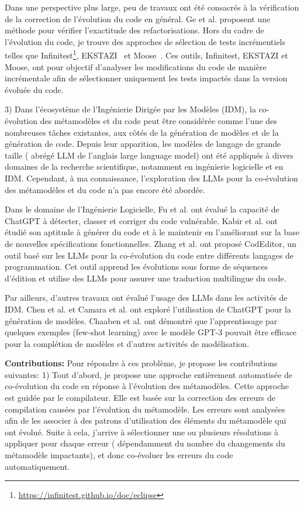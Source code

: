 Dans une perspective plus large, peu de travaux ont été consacrés à la vérification de la correction de l’évolution du code en général.
Ge et al. \cite{10.1145/2568225.2568280} proposent une méthode pour vérifier l'exactitude des refactorisations. Hors du cadre de l’évolution du code, je trouve des approches de sélection de tests incrémentiels telles que Infinitest\footnote{\url{https://infinitest.github.io/doc/eclipse}}, EKSTAZI~\cite{7203050} et Moose~\cite{ducasse2000moose}. Ces outils, Infinitest, EKSTAZI et Moose, ont pour objectif d'analyser les modifications du code de manière incrémentale afin de sélectionner uniquement les tests impactés dans la version évoluée du code.

3) Dans l’écosystème de l’Ingénierie Dirigée par les Modèles (IDM), la co-évolution des métamodèles et du code peut être considérée comme l’une des nombreuses tâches existantes, aux côtés de la génération de modèles et de la génération de code. Depuis leur apparition, les modèles de langage de grande taille ( abrégé LLM de l'anglais large language model) ont été appliqués à divers domaines de la recherche scientifique, notamment en ingénierie logicielle et en IDM. Cependant, à ma connaissance, l’exploration des LLMs pour la co-évolution des métamodèles et du code n’a pas encore été abordée.

Dans le domaine de l’Ingénierie Logicielle, Fu et al. \cite{fu2023chatgpt} ont évalué la capacité de ChatGPT à détecter, classer et corriger du code vulnérable. Kabir et al. \cite{kabir2023empirical} ont étudié son aptitude à générer du code et à le maintenir en l’améliorant sur la base de nouvelles spécifications fonctionnelles. Zhang et al. \cite{zhang2023multilingual} ont proposé CodEditor, un outil basé sur les LLMs pour la co-évolution du code entre différents langages de programmation. Cet outil apprend les évolutions sous forme de séquences d’édition et utilise des LLMs pour assurer une traduction multilingue du code.

Par ailleurs, d’autres travaux ont évalué l’usage des LLMs dans les activités de IDM. Chen et al. \cite{10344012} et Camara et al. \cite{camara2023assessment} ont exploré l’utilisation de ChatGPT pour la génération de modèles. Chaaben et al. \cite{chaaben2023towards} ont démontré que l’apprentissage par quelques exemples (few-shot learning) avec le modèle GPT-3 pouvait être efficace pour la complétion de modèles et d’autres activités de modélisation.

\textbf{Contributions:} Pour répondre à ces problème, je propose les contributions suivantes:
1) Tout d’abord, je propose une approche entièrement automatisée de co-évolution du code en réponse à l’évolution des métamodèles. Cette approche est guidée par le compilateur. Elle est basée sur la correction des erreurs de compilation causées par l'évolution du métamodèle. Les erreurs sont analysées afin de les associer à des patrons d'utilisation des éléments du métamodèle qui ont évolué. Suite à cela, j'arrive à sélectionner une ou plusieurs résolutions à appliquer pour chaque erreur ( dépendamment du nombre du changements du métamodèle impactants), et donc co-évoluer les erreurs du code automatiquement. 


